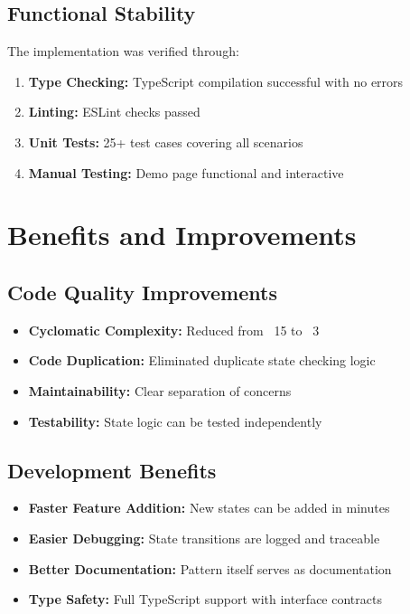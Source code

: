 \documentclass[11pt,a4paper]{article}
\begin{document}
\subsection{Functional Stability}

The implementation was verified through:
\begin{enumerate}
    \item \textbf{Type Checking:} TypeScript compilation successful with no errors
    \item \textbf{Linting:} ESLint checks passed
    \item \textbf{Unit Tests:} 25+ test cases covering all scenarios
    \item \textbf{Manual Testing:} Demo page functional and interactive
\end{enumerate}

\section{Benefits and Improvements}

\subsection{Code Quality Improvements}

\begin{itemize}
    \item \textbf{Cyclomatic Complexity:} Reduced from ~15 to ~3
    \item \textbf{Code Duplication:} Eliminated duplicate state checking logic
    \item \textbf{Maintainability:} Clear separation of concerns
    \item \textbf{Testability:} State logic can be tested independently
\end{itemize}

\subsection{Development Benefits}

\begin{itemize}
    \item \textbf{Faster Feature Addition:} New states can be added in minutes
    \item \textbf{Easier Debugging:} State transitions are logged and traceable
    \item \textbf{Better Documentation:} Pattern itself serves as documentation
    \item \textbf{Type Safety:} Full TypeScript support with interface contracts
\end{itemize}
\end{document}
